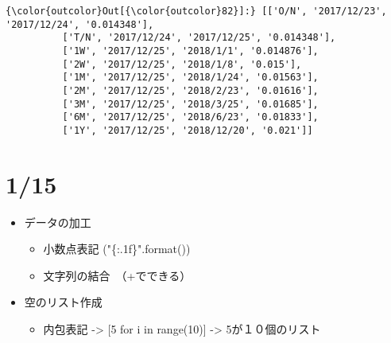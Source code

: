 \documentclass[11pt]{article}
\providecommand{\tightlist}{%
      \setlength{\itemsep}{0pt}\setlength{\parskip}{0pt}}
\begin{document}
\begin{Verbatim}[commandchars=\\\{\}]
{\color{outcolor}Out[{\color{outcolor}82}]:} [['O/N', '2017/12/23', '2017/12/24', '0.014348'],
          ['T/N', '2017/12/24', '2017/12/25', '0.014348'],
          ['1W', '2017/12/25', '2018/1/1', '0.014876'],
          ['2W', '2017/12/25', '2018/1/8', '0.015'],
          ['1M', '2017/12/25', '2018/1/24', '0.01563'],
          ['2M', '2017/12/25', '2018/2/23', '0.01616'],
          ['3M', '2017/12/25', '2018/3/25', '0.01685'],
          ['6M', '2017/12/25', '2018/6/23', '0.01833'],
          ['1Y', '2017/12/25', '2018/12/20', '0.021']]
\end{Verbatim}
            
    \section{1/15}\label{section}

\begin{itemize}
\tightlist
\item
  データの加工

  \begin{itemize}
  \tightlist
  \item
    小数点表記 ("\{:.1f\}".format())
  \item
    文字列の結合　（+でできる）
  \end{itemize}
\item
  空のリスト作成

  \begin{itemize}
  \tightlist
  \item
    内包表記 -\textgreater{} {[}5 for i in range(10){]} -\textgreater{}
    5が１０個のリスト
  \end{itemize}
\end{itemize}
\end{document}
